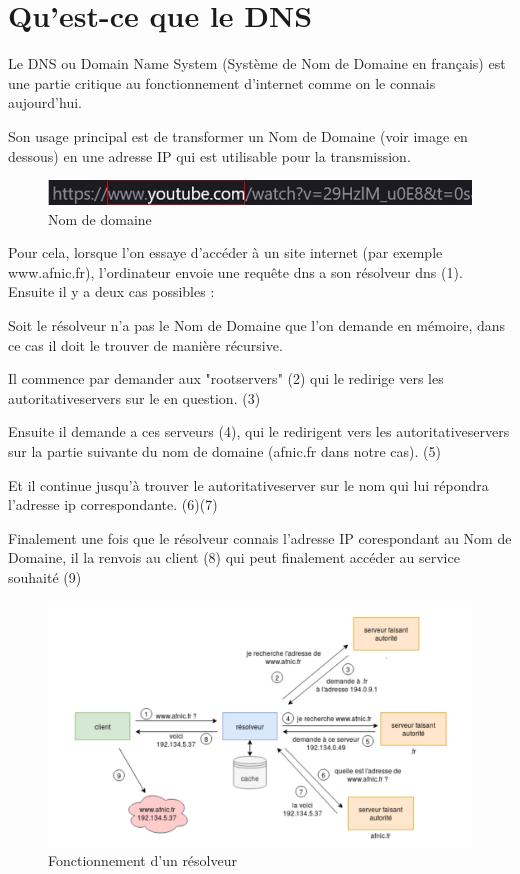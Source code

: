 \section{Qu'est-ce que le DNS}
Le DNS ou Domain Name System (Système de Nom de Domaine en français) est une partie critique au fonctionnement d’internet comme on le connais aujourd’hui.

Son usage principal est de transformer un Nom de Domaine (voir image en dessous) en une adresse IP qui est utilisable pour la transmission.

\begin{figure}[htbp]
  \centering
  \includegraphics[width=\textwidth]{paper/figures/domainName}
  \caption{Nom de domaine}
  \label{fig:domainName}
\end{figure}

Pour cela, lorsque l’on essaye d’accéder à un site internet (par exemple www.afnic.fr), l’ordinateur envoie une requête dns a son résolveur dns (1).
Ensuite il y a deux cas possibles :

Soit le résolveur n’a pas le Nom de Domaine que l’on demande en mémoire, dans ce cas il doit le trouver de manière récursive.

Il commence par demander aux "\glspl{rootserver}" (2) qui le redirige vers les \glspl{autoritativeserver} sur le  en question. (3)

Ensuite il demande a ces serveurs (4), qui le redirigent vers les \glspl{autoritativeserver} sur la partie suivante du nom de domaine (afnic.fr dans notre cas). (5)

Et il continue jusqu’à trouver le \gls{autoritativeserver} sur le nom qui lui répondra l’adresse ip correspondante. (6)(7)

Finalement une fois que le résolveur connais l'adresse IP corespondant au Nom de Domaine, il la renvois au client (8) qui peut finalement accéder au service souhaité (9)

\begin{figure}[htbp]
  \centering
  \includegraphics[width=\textwidth]{paper/figures/resolver}
  \caption{Fonctionnement d'un résolveur}
  \label{fig:resolver}
\end{figure}

